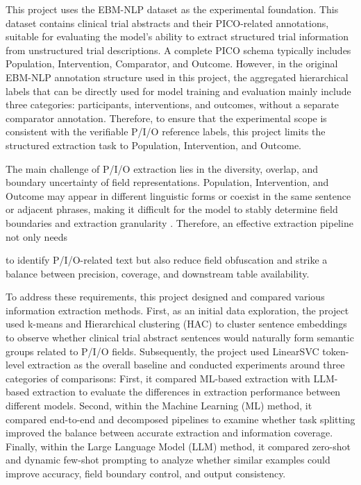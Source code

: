 \documentclass{article}
\begin{document}
This project uses the EBM-NLP dataset as the experimental foundation. This dataset contains clinical trial abstracts and their PICO-related annotations, suitable for evaluating the model’s ability to extract structured trial information from unstructured trial descriptions. A complete PICO schema typically includes Population, Intervention, Comparator, and Outcome. However, in the original EBM-NLP annotation structure used in this project, the aggregated hierarchical labels that can be directly used for model training and evaluation mainly include three categories: participants, interventions, and outcomes, without a separate comparator annotation. Therefore, to ensure that the experimental scope is consistent with the verifiable P/I/O reference labels, this project limits the structured extraction task to Population, Intervention, and Outcome.


The main challenge of P/I/O extraction lies in the diversity, overlap, and boundary uncertainty of field representations. Population, Intervention, and Outcome may appear in different linguistic forms or coexist in the same sentence or adjacent phrases, making it difficult for the model to stably determine field boundaries and extraction granularity \cite{zhang_span-based_2024}. Therefore, an effective extraction pipeline not only needs

to identify P/I/O-related text but also reduce field obfuscation and strike a balance between precision, coverage, and downstream table availability.


To address these requirements, this project designed and compared various information extraction methods. First, as an initial data exploration, the project used k-means and Hierarchical clustering (HAC) to cluster sentence embeddings to observe whether clinical trial abstract sentences would naturally form semantic groups related to P/I/O fields. Subsequently, the project used LinearSVC token-level extraction as the overall baseline and conducted experiments around three categories of comparisons: First, it compared ML-based extraction with LLM-based extraction to evaluate the differences in extraction performance between different models. Second, within the Machine Learning (ML) method, it compared end-to-end and decomposed pipelines to examine whether task splitting improved the balance between accurate extraction and information coverage. Finally, within the Large Language Model (LLM) method, it compared zero-shot and dynamic few-shot prompting to analyze whether similar examples could improve accuracy, field boundary control, and output consistency.
\end{document}
